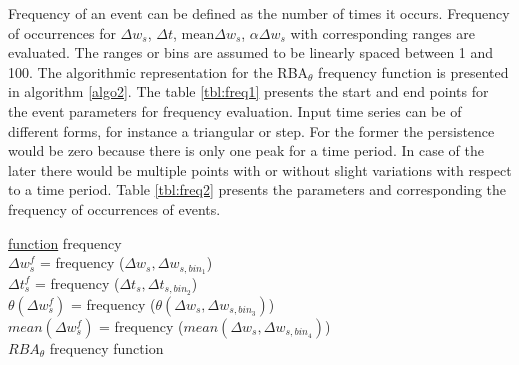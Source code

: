 Frequency of an event can be defined as the number of times it occurs. Frequency of occurrences for $\Delta w_s$, $\Delta t$, $ \text{mean} \Delta w_s$, $\alpha \Delta w_s$ with corresponding ranges are evaluated. The ranges or bins are assumed to be linearly spaced between 1 and 100. The algorithmic representation for the RBA$_\theta$ frequency function is presented in algorithm \ref{algo2}.
The table \ref{tbl:freq1}  presents the start and end points for the event parameters for frequency evaluation. Input time series can be of different forms, for instance a triangular or step. For the former the persistence would be zero because there is only one peak for a time period. In case of the later there would be multiple points with or without slight variations with respect to a time period. 
Table \ref{tbl:freq2} presents the parameters and corresponding the frequency of occurrences of events.

\begin{algorithm}[!htbp] 
\SetAlgoLined
{}
\underline{function} frequency \\
$ \Delta w_{s}^f $ = frequency ($\Delta w_s , \Delta w_{s,bin_1} $) \\
$ \Delta t_{s}^f $ = frequency ($\Delta t_s , \Delta t_{s,bin_2}$) \\
$ \theta (\Delta w_{s}^f) $ = frequency ($ \theta (\Delta w_s , \Delta w_{s,bin_3})$) \\
$ mean (\Delta w_{s}^f) $ = frequency ($ mean (\Delta w_s , \Delta w_{s,bin_4})$) \\
 \caption{$RBA_\theta$ frequency function}
 \label{algo2}
\end{algorithm}


